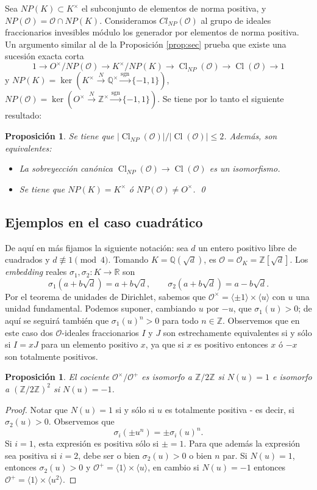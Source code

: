 \documentclass[11pt,a4paper]{amsart}
\newcommand{\R}{\mathbb{R}}
\newcommand{\Q}{\mathbb{Q}}
\newcommand{\Z}{\mathbb{Z}}
\newcommand{\xto}{\xrightarrow}
\DeclareMathOperator{\CL}{Cl}
\numberwithin{equation}{section}
\theoremstyle{plain}
\newtheorem{prop}[equation]{Proposición}
\renewcommand{\O}{\mathcal{O}}
\begin{document}
Sea $NP(K) \subset K^\times$ el subconjunto de elementos de norma positiva,
y $NP(\O) = \O \cap NP(K)$. Consideramos $Cl_{NP}(\O)$ al grupo de ideales
fraccionarios invesibles módulo los generador por elementos de norma positiva.
Un argumento similar al de la Proposición
\ref{prop:sec} prueba que existe una sucesión exacta corta
\[
1 \to O^\times/NP(\O) \to K^\times /NP(K) \to \CL_{NP}(\O) \to \CL(\O) \to 1
\]
y $NP(K) = \ker(K^\times \xto{N} \Q^\times \xto{\mathrm{sgn}}
\{-1,1\})$, $NP(\O) = \ker(O^\times \xto{N} \Z^\times \xto{\mathrm{sgn}}
\{-1,1\})$. Se tiene por lo tanto el siguiente resultado:
\begin{prop}\label{prop:equiv-clnp=cl}
Se tiene que $|\CL_{NP}(\O)|/|\CL(\O)| \le 2$. Además, son equivalentes:
\begin{itemize}
  \item[i)] La sobreyección canónica $\CL_{NP}(\O) \to \CL(\O)$ es
  un isomorfismo.
  \item[ii)] Se tiene que $NP(K) = K^\times$ ó $NP(\O) \neq O^\times$.
\qed
\end{itemize}
\end{prop}

\subsection{Ejemplos en el caso cuadrático} De aquí en más fijamos
la siguiente notación: sea $d$ un entero positivo
libre de cuadrados y
$d \not \equiv 1 \pmod{4}$. Tomando $K = \Q(\sqrt{d})$, es $\O = \O_K =
\Z[\sqrt{d}]$. Los \textit{embedding} reales $\sigma_1, \sigma_2 \colon K
\to \R$ son
\[
\sigma_1(a+b\sqrt{d}) = a+b\sqrt{d}, \qquad
\sigma_2(a+b\sqrt{d}) = a-b\sqrt{d}.
\]
Por el teorema de unidades de Dirichlet, sabemos que $\mathcal O^\times
= \langle\pm 1\rangle \times \langle u \rangle$ con $u$ una unidad
fundamental. Podemos suponer, cambiando $u$ por $-u$, que $\sigma_1(u) > 0$;
de aquí se seguirá también que $\sigma_1(u)^n > 0$ para todo $n \in \Z$.
Observemos que en este caso
dos $\O$-ideales fraccionarios $I$ y $J$
son estrechamente equivalentes si y sólo
si $I = xJ$ para un elemento positivo $x$, ya que si $x$ es positivo
entonces $x$ ó $-x$ son totalmente positivos.

\begin{prop} El cociente $\O^\times/\O^+$ es isomorfo a $\Z/2\Z$
si $N(u) = 1$ e isomorfo a $(\Z/2\Z)^2$ si $N(u) = -1$.
\end{prop}
\begin{proof}
Notar que $N(u) = 1$ si y sólo si $u$ es totalmente positiva
- es decir, si $\sigma_2(u)>0$. Observemos que
\[
\sigma_i(\pm u^n) = \pm \sigma_i(u)^n.
\]
Si $i = 1$, esta expresión es positiva sólo si $\pm = 1$. Para que además
la expresión sea positiva si $i = 2$, debe ser o bien $\sigma_2(u) > 0$
o bien $n$ par. Si $N(u) = 1$, entonces $\sigma_2(u) > 0$ y $\O^+
= \langle 1 \rangle \times \langle u \rangle$, en cambio si $N(u) = -1$
entonces $\O^+ = \langle 1 \rangle \times \langle u^2 \rangle$.
\end{proof}
\end{document}
